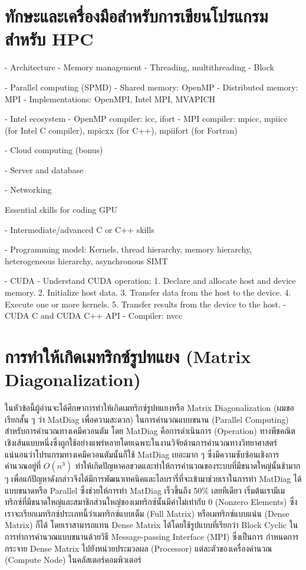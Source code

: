 \section{ทักษะและเครื่องมือสำหรับการเขียนโปรแกรมสำหรับ HPC}

- Architecture
- Memory management
- Threading, multithreading
- Block

- Parallel computing (SPMD)
- Shared memory: OpenMP
- Distributed memory: MPI
- Implementations: OpenMPI, Intel MPI, MVAPICH

- Intel ecosystem
- OpenMP compiler: icc, ifort
- MPI compiler: mpicc, mpiicc (for Intel C compiler), mpicxx (for C++), mpiifort (for Fortran)

- Cloud computing (bonus)

- Server and database

- Networking

Essential skills for coding GPU

- Intermediate/advanced C or C++ skills

- Programming model: Kernels, thread hierarchy, memory hierarchy, heterogeneous hierarchy, asynchronous SIMT

- CUDA
- Understand CUDA operation:
1. Declare and allocate host and device memory.
2. Initialize host data.
3. Transfer data from the host to the device.
4. Execute one or more kernels.
5. Transfer results from the device to the host.
- CUDA C and CUDA C++ API
- Compiler: nvcc

\section{การทำให้เกิดเมทริกซ์รูปทแยง (Matrix Diagonalization)}

ในหัวข้อนี้ผู้อ่านจะได้ศึกษาการทำให้เกิดเมทริกซ์รูปทแยงหรือ Matrix Diagonalization (ผมขอเรียกสั้น ๆ ว่า MatDiag เพื่อความสะดวก)
ในการคำนวณแบบขนาน (Parallel Computing) สำหรับการคำนวณทางเคมีควอนตัม โดย MatDiag คือการดำเนินการ (Operation)
ทางพีชคณิตเชิงเส้นแบบหนึ่งซึ่งถูกใช้อย่างแพร่หลายโดยเฉพาะในงานวิจัยด้านการคำนวณทางวิทยาศาสตร์ แน่นอนว่าโปรแกรมทางเคมีควอนตัมนั้นก็ใช้
MatDiag เยอะมาก ๆ ซึ่งมีความซับซ้อนเชิงการคำนวณอยู่ที่ $O(n^3)$ ทำให้เกิดปัญหาคอขวดและทำให้การคำนวณของระบบที่มีขนาดใหญ่นั้นช้ามาก ๆ
เพื่อแก้ปัญหาดังกล่าวจึงได้มีการพัฒนาเทคนิคและไลบรารี่ที่จะเข้ามาช่วยเราในการทำ MatDiag ได้แบบขนาดหรือ Parallel ซึ่งช่วยให้การทำ
MatDiag เร็วขึ้นถึง 50\% เลยทีเดียว เริ่มต้นเรามีเมทริกซ์ที่มีขนาดใหญ่และสมาชิกส่วนใหญ่ของเมทริกซ์นั้นมีค่าไม่เท่ากับ 0 (Nonzero Elements)
ซึ่งเราจะเรียกเมทริกซ์ประเภทนี้ว่าเมทริกซ์แบบเต็ม (Full Matrix) หรือเมทริกซ์แบบแน่น (Dense Matrix) ก็ได้ โดยเราสามารถแทน Dense
Matrix ได้โดยใช้รูปแบบที่เรียกว่า Block Cyclic ในการทำการคำนวณแบบขนานด้วยวิธี Message-passing Interface (MPI) ซึ่งเป็นการ%
กำหนดการกระจาย Dense Matrix ไปยังหน่วยประมวลผล (Processor) แต่ละตัวของเครื่องคำนวณ (Compute Node) ในคลัสเตอร์คอมพิวเตอร์



